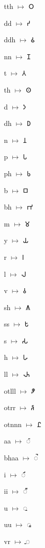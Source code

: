 {\noindent tth $\mapsto$ {\brfont 𑀞}\par
\noindent dd $\mapsto$ {\brfont 𑀟}\par
\noindent ddh $\mapsto$ {\brfont 𑀠}\par
\noindent nn $\mapsto$ {\brfont 𑀡}\par
\noindent t $\mapsto$ {\brfont 𑀢}\par
\noindent th $\mapsto$ {\brfont 𑀣}\par
\noindent d $\mapsto$ {\brfont 𑀤}\par
\noindent dh $\mapsto$ {\brfont 𑀥}\par
\noindent n $\mapsto$ {\brfont 𑀦}\par
\noindent p $\mapsto$ {\brfont 𑀧}\par
\noindent ph $\mapsto$ {\brfont 𑀨}\par
\noindent b $\mapsto$ {\brfont 𑀩}\par
\noindent bh $\mapsto$ {\brfont 𑀪}\par
\noindent m $\mapsto$ {\brfont 𑀫}\par
\noindent y $\mapsto$ {\brfont 𑀬}\par
\noindent r $\mapsto$ {\brfont 𑀭}\par
\noindent l $\mapsto$ {\brfont 𑀮}\par
\noindent v $\mapsto$ {\brfont 𑀯}\par
\noindent sh $\mapsto$ {\brfont 𑀰}\par
\noindent ss $\mapsto$ {\brfont 𑀱}\par
\noindent s $\mapsto$ {\brfont 𑀲}\par
\noindent h $\mapsto$ {\brfont 𑀳}\par
\noindent ll $\mapsto$ {\brfont 𑀴}\par
\noindent otlll $\mapsto$ {\brfont 𑀵}\par
\noindent otrr $\mapsto$ {\brfont 𑀶}\par
\noindent otnnn $\mapsto$ {\brfont 𑀷}\par
\noindent aa $\mapsto$ {\brfont 𑀸}\par
\noindent bhaa $\mapsto$ {\brfont 𑀹}\par
\noindent i $\mapsto$ {\brfont 𑀺}\par
\noindent ii $\mapsto$ {\brfont 𑀻}\par
\noindent u $\mapsto$ {\brfont 𑀼}\par
\noindent uu $\mapsto$ {\brfont 𑀽}\par
\noindent vr $\mapsto$ {\brfont 𑀾}\par
}
